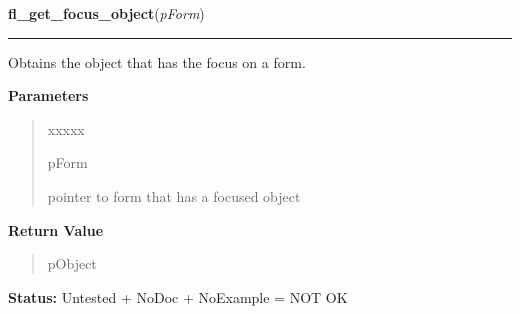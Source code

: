 \hspace{.8\funcindent}\begin{boxedminipage}{\funcwidth}

    \raggedright \textbf{fl\_get\_focus\_object}(\textit{pForm})

    \vspace{-1.5ex}

    \rule{\textwidth}{0.5\fboxrule}
\setlength{\parskip}{2ex}
    Obtains the object that has the focus on a form.

\setlength{\parskip}{1ex}
      \textbf{Parameters}
      \vspace{-1ex}

      \begin{quote}
        \begin{Ventry}{xxxxx}

          \item[pForm]

          pointer to form that has a focused object

        \end{Ventry}

      \end{quote}

      \textbf{Return Value}
    \vspace{-1ex}

      \begin{quote}
      pObject

      \end{quote}

\textbf{Status:} Untested + NoDoc + NoExample = NOT OK



    \end{boxedminipage}

    \label{xformslib:library:fl_reset_focus_object}

    \vspace{0.5ex}

